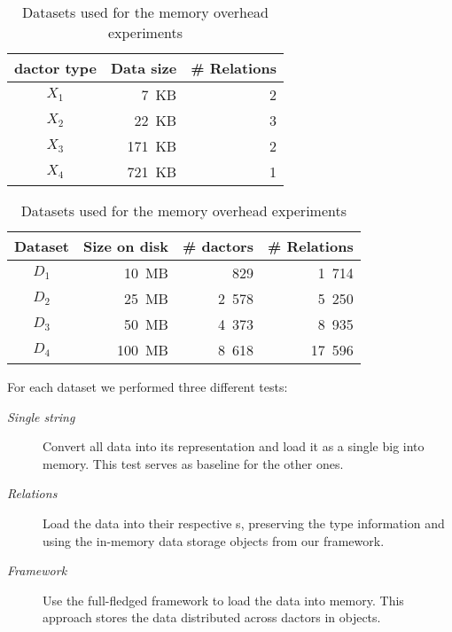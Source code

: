  \begin{table}
    \centering
    \begin{subtable}[t]{0.445\textwidth}
      \centering
      \begin{tabular}{@{}crr@{}}
        \toprule
        \textbf{\gls{dactor} type} & \textbf{Data size} & \textbf{\# Relations}\\
        \midrule
        $X_1$ &   7~KB & 2 \\ %
        $X_2$ &  22~KB & 3 \\ %
        $X_3$ & 171~KB & 2 \\ %
        $X_4$ & 721~KB & 1 \\ %
        \bottomrule
      \end{tabular}
      \label{tab:datasets:size_distribution}
    \end{subtable}
    \begin{subtable}[t]{0.545\textwidth}
      \centering
      \begin{tabular}{@{}crrr@{}}
        \toprule
        \textbf{Dataset} & \textbf{Size on disk} & \textbf{\# \glspl{dactor}} & \textbf{\# Relations}\\
        \midrule
        $D_1$ & 10~MB & 829 & 1~714 \\
        $D_2$ & 25~MB & 2~578 & 5~250 \\
        $D_3$ & 50~MB & 4~373 & 8~935 \\
        $D_4$ & 100~MB & 8~618 & 17~596 \\
        \bottomrule
      \end{tabular}
      \label{tab:datasets:keyfigures}
    \end{subtable}
    \caption{Datasets used for the memory overhead experiments}
    \label{tab:datasets}
  \end{table}

  For each dataset we performed three different tests:
  \begin{description}
    \item[\textit{Single string}] Convert all data into its  representation and load it as a single big  into memory.
      This test serves as baseline for the other ones.
    \item[\textit{Relations}] Load the data into their respective s, preserving the type information and using the in-memory data storage objects from our framework.
    \item[\textit{Framework}] Use the full-fledged framework to load the data into memory.
      This approach stores the data distributed across \glspl{dactor} in  objects.
  \end{description}

